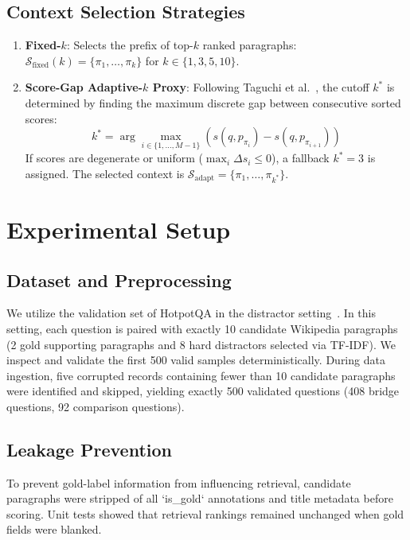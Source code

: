 \documentclass[conference]{IEEEtran}
\begin{document}
\subsection{Context Selection Strategies}
\begin{enumerate}
    \item \textbf{Fixed-$k$}: Selects the prefix of top-$k$ ranked paragraphs: $\mathcal{S}_{\text{fixed}}(k) = \{\pi_1, \dots, \pi_k\}$ for $k \in \{1, 3, 5, 10\}$.
    \item \textbf{Score-Gap Adaptive-$k$ Proxy}: Following Taguchi et al.~\cite{taguchi2025adaptivek}, the cutoff $k^*$ is determined by finding the maximum discrete gap between consecutive sorted scores:
    \begin{equation}
        k^* = \arg\max_{i \in \{1, \dots, M-1\}} \left( s(q, p_{\pi_i}) - s(q, p_{\pi_{i+1}}) \right)
    \end{equation}
    If scores are degenerate or uniform ($\max_i \Delta s_i \le 0$), a fallback $k^* = 3$ is assigned. The selected context is $\mathcal{S}_{\text{adapt}} = \{\pi_1, \dots, \pi_{k^*}\}$.
\end{enumerate}

\section{Experimental Setup}
\subsection{Dataset and Preprocessing}
We utilize the validation set of HotpotQA in the distractor setting~\cite{yang2018hotpotqa}. In this setting, each question is paired with exactly 10 candidate Wikipedia paragraphs (2 gold supporting paragraphs and 8 hard distractors selected via TF-IDF). We inspect and validate the first 500 valid samples deterministically. During data ingestion, five corrupted records containing fewer than 10 candidate paragraphs were identified and skipped, yielding exactly 500 validated questions (408 bridge questions, 92 comparison questions).

\subsection{Leakage Prevention}
To prevent gold-label information from influencing retrieval, candidate paragraphs were stripped of all `is\_gold` annotations and title metadata before scoring. Unit tests showed that retrieval rankings remained unchanged when gold fields were blanked.
\end{document}

